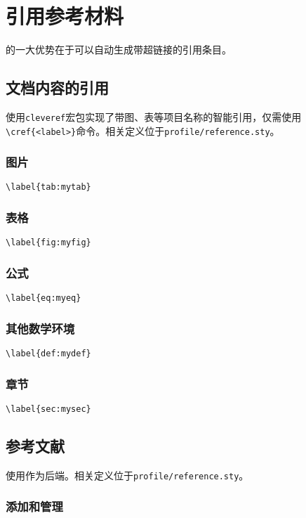 \chapter{引用参考材料}
\label{chap:reference}

的一大优势在于可以自动生成带超链接的引用条目。

\section{文档内容的引用}

使用\lstinline|cleveref|宏包实现了带图、表等项目名称的智能引用，仅需使用\lstinline|\cref{<label>}|命令。相关定义位于\lstinline|profile/reference.sty|。

\subsection{图片}

\lstinline|\label{tab:mytab}|

\subsection{表格}

\lstinline|\label{fig:myfig}|

\subsection{公式}

\lstinline|\label{eq:myeq}|


\subsection{其他数学环境}

\lstinline|\label{def:mydef}|

\subsection{章节}


\lstinline|\label{sec:mysec}|

\section{参考文献}

使用作为后端。相关定义位于\lstinline|profile/reference.sty|。

\subsection{添加和管理}

